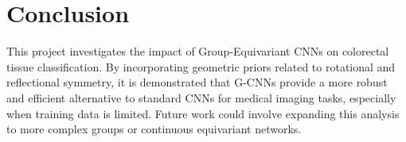\section{Conclusion}
This project investigates the impact of Group-Equivariant CNNs on colorectal tissue classification. By incorporating geometric priors related to rotational and reflectional symmetry, it is demonstrated that G-CNNs provide a more robust and efficient alternative to standard CNNs for medical imaging tasks, especially when training data is limited. Future work could involve expanding this analysis to more complex groups or continuous equivariant networks.
